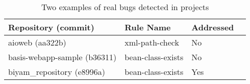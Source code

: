 \begin{table*}[ht]
\centering
\caption{Two examples of real bugs detected in \totalInterestingEAs projects}
\begin{tabular}{|p{3.6cm}|l|l|p{6cm}|}
\hline
\textbf{Repository (commit)} & \textbf{Rule Name} & \textbf{Addressed} \\
\hline
aioweb (aa322b) & xml-path-check & No \\
\hline
basis-webapp-sample (b36311) & bean-class-exists & No \\
\hline
biyam\_repository (e8996a) & bean-class-exists & Yes \\
\hline
\end{tabular}
\label{tab:real-bugs}
\end{table*}